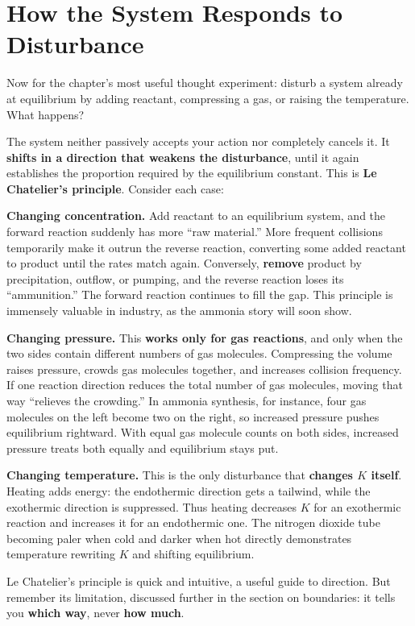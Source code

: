 \section{How the System Responds to Disturbance}

Now for the chapter's most useful thought experiment: disturb a system already at equilibrium by adding reactant, compressing a gas, or raising the temperature. What happens?

The system neither passively accepts your action nor completely cancels it. It \textbf{shifts in a direction that weakens the disturbance}, until it again establishes the proportion required by the equilibrium constant. This is \textbf{Le Chatelier's principle}. Consider each case:

\textbf{Changing concentration.} Add reactant to an equilibrium system, and the forward reaction suddenly has more ``raw material.'' More frequent collisions temporarily make it outrun the reverse reaction, converting some added reactant to product until the rates match again. Conversely, \textbf{remove} product by precipitation, outflow, or pumping, and the reverse reaction loses its ``ammunition.'' The forward reaction continues to fill the gap. This principle is immensely valuable in industry, as the ammonia story will soon show.

\textbf{Changing pressure.} This \textbf{works only for gas reactions}, and only when the two sides contain different numbers of gas molecules. Compressing the volume raises pressure, crowds gas molecules together, and increases collision frequency. If one reaction direction reduces the total number of gas molecules, moving that way ``relieves the crowding.'' In ammonia synthesis, for instance, four gas molecules on the left become two on the right, so increased pressure pushes equilibrium rightward. With equal gas molecule counts on both sides, increased pressure treats both equally and equilibrium stays put.

\textbf{Changing temperature.} This is the only disturbance that \textbf{changes $K$ itself}. Heating adds energy: the endothermic direction gets a tailwind, while the exothermic direction is suppressed. Thus heating decreases $K$ for an exothermic reaction and increases it for an endothermic one. The nitrogen dioxide tube becoming paler when cold and darker when hot directly demonstrates temperature rewriting $K$ and shifting equilibrium.

Le Chatelier's principle is quick and intuitive, a useful guide to direction. But remember its limitation, discussed further in the section on boundaries: it tells you \textbf{which way}, never \textbf{how much}.

